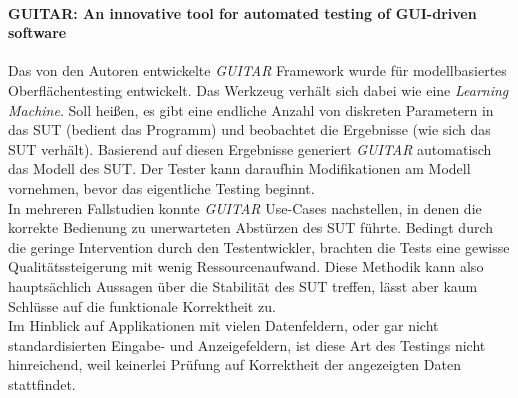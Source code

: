 \paragraph{GUITAR: An innovative tool for automated testing of GUI-driven software \cite{nguyen_guitar:_2014}}Das von den Autoren entwickelte \textit{GUITAR} Framework wurde für modellbasiertes Oberflächentesting entwickelt. Das Werkzeug verhält sich dabei wie eine \textit{Learning Machine}. Soll heißen, es gibt eine endliche Anzahl von diskreten Parametern in das \Gls{SUT} (bedient das Programm) und beobachtet die Ergebnisse (wie sich das \Gls{SUT} verhält). Basierend auf diesen Ergebnisse generiert \textit{GUITAR} automatisch das Modell des SUT. Der Tester kann daraufhin Modifikationen am Modell vornehmen, bevor das eigentliche Testing beginnt.\\ 
In mehreren Fallstudien konnte \textit{GUITAR} Use-Cases nachstellen, in denen die korrekte Bedienung zu unerwarteten Abstürzen des \Gls{SUT} führte. Bedingt durch die geringe Intervention durch den Testentwickler, brachten die Tests eine gewisse Qualitätssteigerung mit wenig Ressourcenaufwand. Diese Methodik kann also hauptsächlich Aussagen über die Stabilität des \Gls{SUT} treffen, lässt aber kaum Schlüsse auf die funktionale Korrektheit zu.\\
Im Hinblick auf Applikationen mit vielen Datenfeldern, oder gar nicht standardisierten Eingabe- und Anzeigefeldern, ist diese Art des Testings nicht hinreichend, weil keinerlei Prüfung auf Korrektheit der angezeigten Daten stattfindet.

